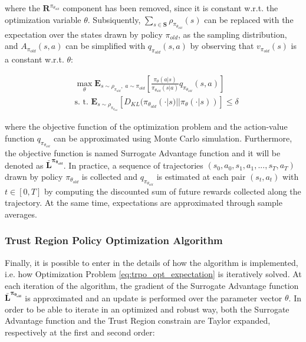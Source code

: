                where the $\mathbf{R}^{\pi_{\theta_{old}}}$ component has been removed, since it is constant w.r.t. the optimization variable $\theta$. Subsiquently, $\sum_{s \in \mathbf{S}} \rho_{\pi_{\theta_{old}}}(s)$ can be replaced with the expectation over the states drawn by policy $\pi_{old}$, as the sampling distribution, and $A_{\pi_{old}}(s, a)$ can be simplified with $q_{\pi_{old}}(s, a)$ by observing that $v_{\pi_{old}}(s)$ is a constant w.r.t. $\theta$:
                
                \begin{align}
                    \label{eq:trpo_opt_expectation}
                    &\max_{\theta} \mathbf{E}_{s\sim\rho_{\pi_{old}},\;a\sim\pi_{old}} \left[ \frac{\pi_{\theta}(a|s)}{\pi_{\theta_{old}}(s|a)} q_{\pi_{\theta_{old}}}(s,a)\right] \\
                    &\text{s. t. } \mathbf{E}_{s\sim\rho_{\pi_{\theta_{old}}}} \left[ D_{KL} ( \pi_{\theta_{old}}(\cdot|s) || \pi_{\theta} (\cdot|s) ) \right] \leq \delta \nonumber
                \end{align}
                
                where the objective function of the optimization problem and the action-value function $q_{\pi_{\theta_{old}}}$ can be approximated using Monte Carlo simulation. Furthermore, the objective function is named Surrogate Advantage function and it will be denoted as $\mathbf{\bar{L}^{\pi_{\theta_{old}}}}$. \newline
                In practice, a sequence of trajectories $(s_0, a_0, s_1, a_1, ..., s_T, a_T)$ drawn by policy $\pi_{\theta_{old}}$ is collected and $q_{\pi_{\theta_{old}}}$ is estimated at each pair $(s_t, a_t)$ with $t \in [0, T]$ by computing the discounted sum of future rewards collected along the trajectory. At the same time, expectations are approximated through sample averages.
                
            \subsubsection{Trust Region Policy Optimization Algorithm}
                Finally, it is possible to enter in the details of how the algorithm is implemented, i.e. how Optimization Problem \ref{eq:trpo_opt_expectation} is iteratively solved. At each iteration of the algorithm, the gradient of the Surrogate Advantage function $\mathbf{\bar{L}^{\pi_{\theta_{old}}}}$ is approximated and an update is performed over the parameter vector $\theta$. In order to be able to iterate in an optimized and robust way, both the Surrogate Advantage function and the Trust Region constrain are Taylor expanded, respectively at the first and second order:
                
